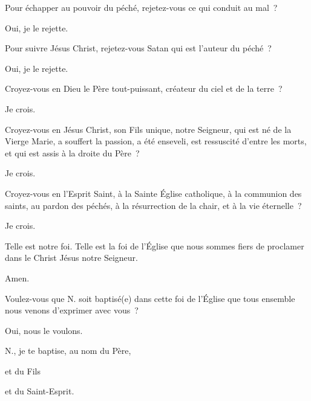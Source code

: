  Pour échapper au pouvoir du péché, rejetez-vous ce qui
conduit au mal~?

 Oui, je le rejette.

 Pour suivre Jésus Christ, rejetez-vous Satan qui est
l'auteur du péché~?

 Oui, je le rejette.


Croyez-vous en Dieu le Père tout-puissant, créateur du ciel et de la terre~?

 Je crois.

 Croyez-vous en Jésus Christ, son Fils unique, notre
Seigneur, qui est né de la Vierge Marie, a souffert la passion, a été
enseveli, est ressuscité d'entre les morts, et qui est assis à la droite
du Père~?

 Je crois.

 Croyez-vous en l'Esprit Saint, à la Sainte Église
catholique, à la communion des saints, au pardon des péchés, à la
résurrection de la chair, et à la vie éternelle~?

 Je crois.

 Telle est notre foi. Telle est la foi de l'Église
que nous sommes fiers de proclamer dans le Christ Jésus notre Seigneur.

 Amen.

\pars{}


Voulez-vous que {\color{red}N.} soit baptisé(e) dans cette foi de
l'Église que tous ensemble nous venons d'exprimer avec vous~?

 Oui, nous le voulons.


{\color{red}N.}, je te baptise, au nom du Père, 


et du Fils


et du Saint-Esprit.

